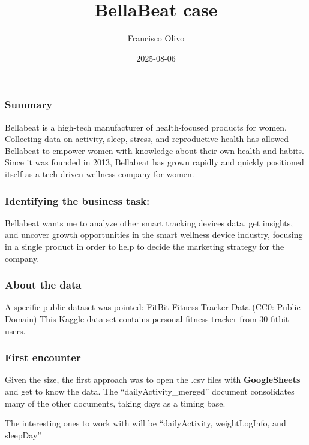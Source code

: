 \documentclass[
]{article}
\title{BellaBeat case}
\author{Francisco Olivo}
\date{2025-08-06}
\begin{document}
\maketitle

\subsubsection{Summary}\label{summary}

Bellabeat is a high-tech manufacturer of health-focused products for
women. Collecting data on activity, sleep, stress, and reproductive
health has allowed Bellabeat to empower women with knowledge about their
own health and habits. Since it was founded in 2013, Bellabeat has grown
rapidly and quickly positioned itself as a tech-driven wellness company
for women.

\subsubsection{Identifying the business
task:}\label{identifying-the-business-task}

Bellabeat wants me to analyze other smart tracking devices data, get
insights, and uncover growth opportunities in the smart wellness device
industry, focusing in a single product in order to help to decide the
marketing strategy for the company.

\subsubsection{About the data}\label{about-the-data}

A specific public dataset was pointed:
\href{https://www.kaggle.com/datasets/arashnic/fitbit}{FitBit Fitness
Tracker Data} (CC0: Public Domain) This Kaggle data set contains
personal fitness tracker from 30 fitbit users.

\subsubsection{First encounter}\label{first-encounter}

Given the size, the first approach was to open the .csv files with
\textbf{GoogleSheets} and get to know the data. The
``dailyActivity\_merged'' document consolidates many of the other
documents, taking days as a timing base.

The interesting ones to work with will be ``dailyActivity,
weightLogInfo, and sleepDay''
\end{document}
